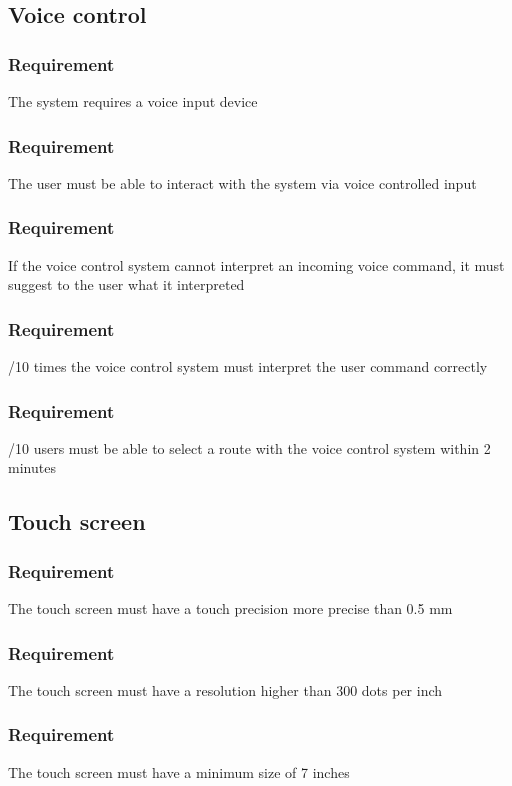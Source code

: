 \documentclass{article}
\begin{document}
{  \subsection{Voice control}
      \subsubsection{Requirement}
\hfill \break 
\- \- \-The system requires a voice input device
      \subsubsection{Requirement}
\hfill \break 
\- \- \-The user must be able to interact with the system via voice controlled input
      \subsubsection{Requirement}
\hfill \break 
\- \- \-If the voice control system cannot interpret an incoming voice command, it must suggest to the user what it interpreted
      \subsubsection{Requirement}
\hfill \break 
\- \- /10 times the voice control system must interpret the user command correctly
      \subsubsection{Requirement}
\hfill \break 
\- \- /10 users must be able to select a route with the voice control system within 2 minutes
  \subsection{Touch screen}
      \subsubsection{Requirement}
\hfill \break 
\- \- \-The touch screen must have a touch precision more precise than 0.5 mm
      \subsubsection{Requirement}
\hfill \break 
\- \- \-The touch screen must have a resolution higher than 300 dots per inch
      \subsubsection{Requirement}
\hfill \break 
\- \- \-The touch screen must have a minimum size of 7 inches
}
\end{document}
